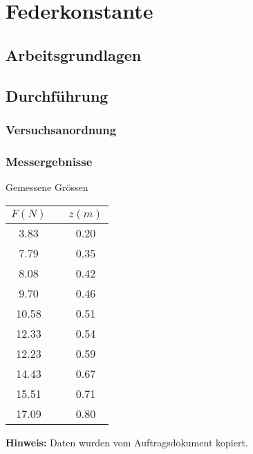 \section{Federkonstante}

\subsection{Arbeitsgrundlagen}

\subsection{Durchf\"{u}hrung}

\subsubsection*{Versuchsanordnung}

\subsubsection*{Messergebnisse}

\begin{threeparttable}
    \caption{Gemessene Gr\"ossen}
    \begin{tabular}{ccc}
        \toprule
        $F (N)$ & \hspace{12mm} & $z (m)$ \\
        \midrule
        3.83  & & 0.20 \\
        7.79  & & 0.35 \\
        8.08  & & 0.42 \\
        9.70  & & 0.46 \\
        10.58 & & 0.51 \\
        12.33 & & 0.54 \\
        12.23 & & 0.59 \\
        14.43 & & 0.67 \\
        15.51 & & 0.71 \\
        17.09 & & 0.80 \\
        \bottomrule
    \end{tabular}
    \begin{tablenotes}
        \small
        \item \textbf{Hinweis:} Daten wurden vom Auftragsdokument kopiert.
    \end{tablenotes}
\end{threeparttable}


